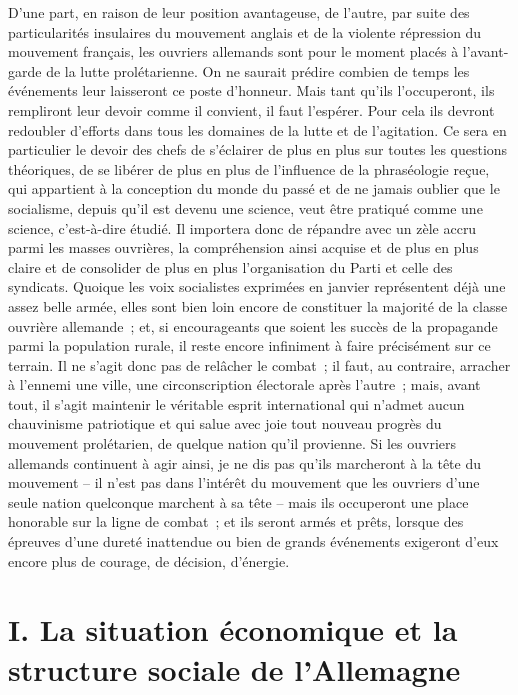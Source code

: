 \documentclass[french,twoside]{book} %
\newcommand\chapteropen{} %
\newcommand\chapterclose{} %
\begin{document}
D’une part, en raison de leur position avantageuse, de l’autre, par suite des particularités insulaires du mouvement anglais et de la violente répression du mouvement français, les ouvriers allemands sont pour le moment placés à l’avant-garde de la lutte prolétarienne. On ne saurait prédire combien de temps les événements leur laisseront ce poste d’honneur. Mais tant qu’ils l’occuperont, ils rempliront leur devoir comme il convient, il faut l’espérer. Pour cela ils devront redoubler d’efforts dans tous les domaines de la lutte et de l’agitation. Ce sera en particulier le devoir des chefs de s’éclairer de plus en plus sur toutes les questions théoriques, de se libérer de plus en plus de l’influence de la phraséologie reçue, qui appartient à la conception du monde du passé et de ne jamais oublier que le socialisme, depuis qu’il est devenu une science, veut être pratiqué comme une science, c’est-à-dire étudié. Il importera donc de répandre avec un zèle accru parmi les masses ouvrières, la compréhension ainsi acquise et de plus en plus claire et de consolider de plus en plus l’organisation du Parti et celle des syndicats. Quoique les voix socialistes exprimées en janvier représentent déjà une assez belle armée, elles sont bien loin encore de constituer la majorité de la classe ouvrière allemande ; et, si encourageants que soient les succès de la propagande parmi la population rurale, il reste encore infiniment à faire précisément sur ce terrain. Il ne s’agit donc pas de relâcher le combat ; il faut, au contraire, arracher à l’ennemi une ville, une circonscription électorale après l’autre ; mais, avant tout, il s’agit maintenir le véritable esprit international qui n’admet aucun chauvinisme patriotique et qui salue avec joie tout nouveau progrès du mouvement prolétarien, de quelque nation qu’il provienne. Si les ouvriers allemands continuent à agir ainsi, je ne dis pas qu’ils marcheront à la tête du mouvement – il n’est pas dans l’intérêt du mouvement que les ouvriers d’une seule nation quelconque marchent à sa tête – mais ils occuperont une place honorable sur la ligne de combat ; et ils seront armés et prêts, lorsque des épreuves d’une dureté inattendue ou bien de grands événements exigeront d’eux encore plus de courage, de décision, d’énergie.
\chapterclose


\chapteropen
\chapter[{I. La situation économique et la structure sociale de l’Allemagne}]{I. La situation économique et la structure sociale de l’Allemagne}\renewcommand{\leftmark}{I. La situation économique et la structure sociale de l’Allemagne}
\end{document}
